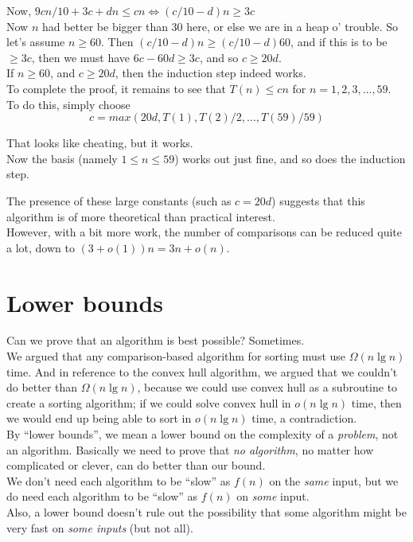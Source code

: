 \documentclass[12pt]{article}
\theoremstyle{plain}
\theoremstyle{definition}
\begin{document}
Now, $9cn/10 + 3c + dn \leq cn \iff (c/10 - d)n \geq 3c$ \\
Now $n$ had better be bigger than 30 here, or else we are in a heap o' trouble.
So let's assume $n \geq 60$. Then $(c/10 - d) n \geq (c/10 - d) 60$, and if this is to be $\geq 3c$, then we must have $6c - 60d \geq 3c$, and so $c \geq 20d$. \\
If $n \geq 60$, and $c \geq 20d$, then the induction step indeed works. \\

To complete the proof, it remains to see that $T(n) \leq cn$ for $n = 1, 2, 3, \dots, 59$. \\
To do this, simply choose
$$c = max(20d, T(1), T(2)/2, ..., T(59)/59)$$

That looks like cheating, but it works. \\
Now the basis (namely $1 \leq n \leq 59$) works out just fine, and so does the induction step.

The presence of these large constants (such as $c = 20d$) suggests that this algorithm is of more theoretical than practical interest. \\
However, with a bit more work, the number of comparisons can be reduced quite a lot, down to $(3+o(1))n = 3n + o(n)$. \label{sec:linear_select}

\newpage
\section{Lower bounds}
Can we prove that an algorithm is best possible?
Sometimes. \\

We argued that any comparison-based algorithm for sorting must use $\Omega(n \lg n)$ time.
And in reference to the convex hull algorithm, we argued that we couldn't do better than $\Omega(n \lg n)$, because we could use convex hull as a subroutine to create a sorting algorithm;
if we could solve convex hull in $o(n \lg n)$ time, then we would end up being able to sort in $o(n \lg n)$ time, a contradiction. \\

By ``lower bounds'', we mean a lower bound on the complexity of a \emph{problem}, not an algorithm.
Basically we need to prove that \emph{no algorithm}, no matter how complicated or clever, can do better than our bound. \\
We don't need each algorithm to be ``slow'' as $f(n)$ on the \emph{same} input, but we do need each algorithm to be ``slow'' as $f(n)$ on \emph{some} input. \\
Also, a lower bound doesn't rule out the possibility that some algorithm might be very fast on \emph{some inputs} (but not all).
\end{document}
